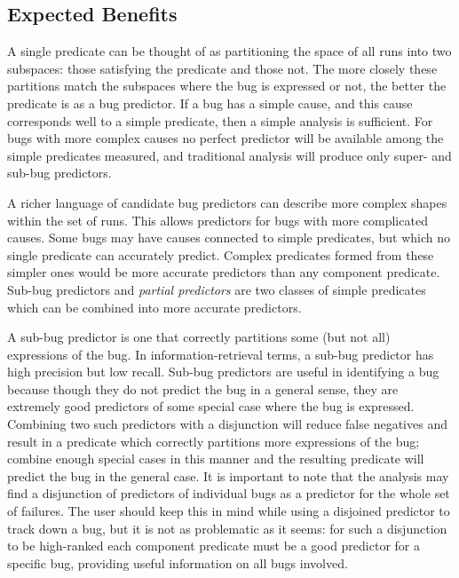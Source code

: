 \subsection{Expected Benefits}
A single predicate can be thought of as partitioning the space of all runs into two subspaces: those satisfying the predicate and those not.  The more closely these partitions match the subspaces where the bug is expressed or not, the better the predicate is as a bug predictor.  If a bug has a simple cause, and this cause corresponds well to a simple predicate, then a simple analysis is sufficient.  For bugs with more complex causes no perfect predictor will be available among the simple predicates measured, and traditional analysis will produce only super- and sub-bug predictors.

A richer language of candidate bug predictors can describe more complex shapes within the set of runs.  This allows predictors for bugs with more complicated causes.  Some bugs may have causes connected to simple predicates, but which no single predicate can accurately predict.  Complex predicates formed from these simpler ones would be more accurate predictors than any component predicate.  Sub-bug predictors and \emph{partial predictors} are two classes of simple predicates which can be combined into more accurate predictors.

A sub-bug predictor is one that correctly partitions some (but not all) expressions of the bug.  In information-retrieval terms, a sub-bug predictor has high precision but low recall.  Sub-bug predictors are useful in identifying a bug because though they do not predict the bug in a general sense, they are extremely good predictors of some special case where the bug is expressed.  Combining two such predictors with a disjunction will reduce false negatives and result in a predicate which correctly partitions more expressions of the bug; combine enough special cases in this manner and the resulting predicate will predict the bug in the general case.  It is important to note that the analysis may find a disjunction of predictors of individual bugs as a predictor for the whole set of failures.  The user should keep this in mind while using a disjoined predictor to track down a bug, but it is not as problematic as it seems: for such a disjunction to be high-ranked each component predicate must be a good predictor for a specific bug, providing useful information on all bugs involved.

